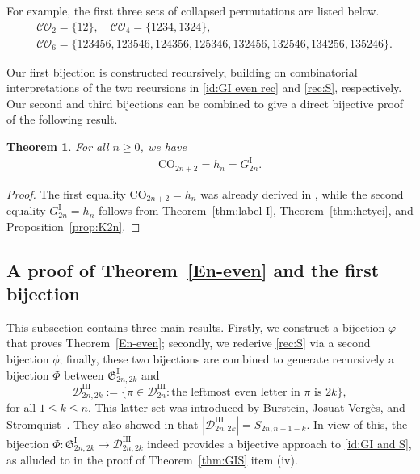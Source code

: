 \documentclass[11pt,reqno]{amsart}
\numberwithin{equation}{section}
\theoremstyle{plain}
\newtheorem{theorem}{Theorem}[section]
\theoremstyle{definition}
\newcommand{\D}{\mathcal{D}}
\newcommand{\fG}{\mathfrak{G}}
\newcommand{\GI}{\fG^{\mathrm{I}}}
\newcommand{\Gi}{G^{\mathrm{I}}}
\def\CO{\mathcal{CO}}
\def\Co{\mathrm{CO}}
\begin{document}
For example, the first three sets of collapsed permutations are listed below.
\begin{align*}
		&\CO_{2}=\{12\},\quad \CO_{4}=\{1234, 1324\}, \\
		&\CO_{6}=\{123456, 123546, 124356, 125346, 132456, 132546, 134256, 135246\}.
\end{align*}

Our first bijection is constructed recursively, building on combinatorial interpretations of the two recursions in \eqref{id:GI even rec} and \eqref{rec:S}, respectively. Our second and third bijections can be combined to give a direct bijective proof of the following result.
\begin{theorem}
For all $n\ge 0$, we have
\begin{align}\label{id:Co and GI}
\Co_{2n+2}=h_n=\Gi_{2n}.
\end{align}
\end{theorem}
\begin{proof}
The first equality $\Co_{2n+2}=h_n$ was already derived in \cite[Theorem~4.3]{AHT22}, while the second equality $\Gi_{2n}=h_n$ follows from Theorem~\ref{thm:label-I}, Theorem~\ref{thm:hetyei}, and Proposition~\ref{prop:K2n}.
\end{proof}

\subsection{A proof of Theorem~\ref{En-even} and the first bijection}
This subsection contains three main results. Firstly, we construct a bijection $\varphi$ that proves Theorem~\ref{En-even}; secondly, we rederive \eqref{rec:S} via a second bijection $\phi$; finally, these two bijections are combined to generate recursively a bijection $\Phi$ between $\GI_{2n,2k}$ and 
$$\D^{\mathrm{III}}_{2n,2k}:=\{\pi\in\D^{\mathrm{III}}_{2n}: \text{the leftmost even letter in $\pi$ is $2k$}\},$$
for all $1\le k\le n$. This latter set was introduced by Burstein, Josuat-Verg\`es, and Stromquist~\cite[Definition~5.1]{BJS10}. They also showed in \cite[Theorem~5.3]{BJS10} that $|\D^{\mathrm{III}}_{2n,2k}|=S_{2n,n+1-k}$. In view of this, the bijection $\Phi:\GI_{2n,2k}\to\D^{\mathrm{III}}_{2n,2k}$ indeed provides a bijective approach to \eqref{id:GI and S}, as alluded to in the proof of Theorem~\ref{thm:GIS} item (iv).
\end{document}
